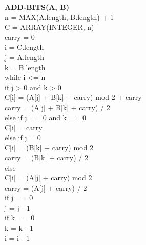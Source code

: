 \documentclass{article}
\begin{document}
\noindent\textbf{ADD-BITS(A, B)}\\
\indent n = MAX(A.length, B.length) + 1\\
\indent C = ARRAY(INTEGER, n)\\
\indent carry = 0\\
\indent i = C.length\\
\indent j = A.length\\
\indent k = B.length\\
\indent while i <= n\\
\indent\indent if j > 0 and k > 0\\
\indent\indent\indent C[i] = (A[j] + B[k] + carry) mod 2 + carry\\
\indent\indent\indent carry = (A[j] + B[k] + carry) / 2\\
\indent\indent else if j == 0 and k == 0\\
\indent\indent\indent C[i] = carry\\
\indent\indent else if j = 0\\
\indent\indent\indent C[i] = (B[k] + carry) mod 2\\
\indent\indent\indent carry = (B[k] + carry)  / 2\\
\indent\indent else\\
\indent\indent\indent C[i] = (A[j] + carry) mod 2\\
\indent\indent\indent carry = (A[j] + carry)  / 2\\
\indent\indent if j == 0\\
\indent\indent\indent j = j - 1\\
\indent\indent if k == 0\\
\indent\indent\indent k = k - 1\\
\indent\indent i = i - 1\\
\end{document}
